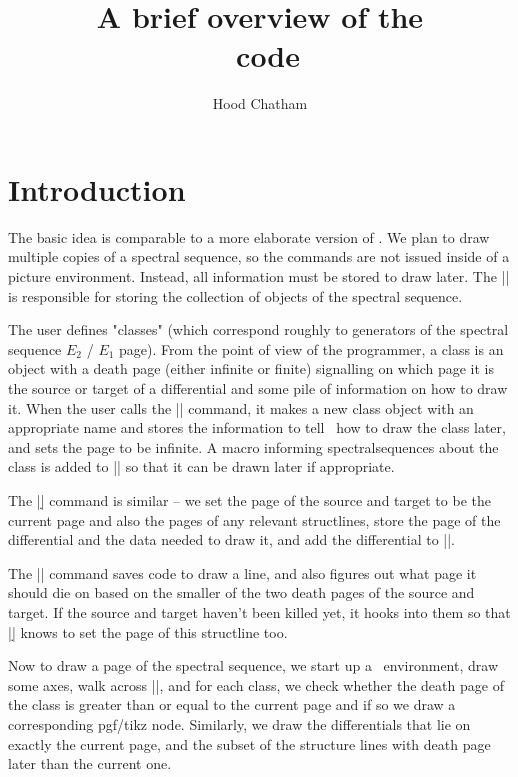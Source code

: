 

\def\eatclnifpresent#1{#1}
\def\pgfkeysname{pgfkeys}
\def\file#1{\path{#1.code.tex}}

\title{A brief overview of the \\ \sseqpages\ code}
\author{Hood Chatham\\\mailtoHC}
\maketitle
\section{Introduction}
The basic idea is comparable to a more elaborate version of \tikzcdpkg.
We plan to draw multiple copies of a spectral sequence, so the commands are not issued inside of a picture environment.
Instead, all information must be stored to draw later. The |\sseq@savedpaths| is responsible for storing the collection of objects of the spectral sequence.

The user defines "classes" (which correspond roughly to generators of the spectral sequence $E_2$ / $E_1$ page).
From the point of view of the programmer, a class is an object with a death page (either infinite or finite) signalling on which page it is the source or target of a differential
and some pile of information on how to draw it. When the user calls the |\class| command, it makes a new class object with an appropriate name and stores the
information to tell \spectralsequences\ how to draw the class later, and sets the page to be infinite. A macro informing spectralsequences about the class
is added to |\sseq@savedpaths| so that it can be drawn later if appropriate.

The |\d| command is similar -- we set the page of the source and target to be the current page and also the pages of any relevant structlines, store the page of the differential and the data needed to draw it, and add the differential to |\sseq@savedpaths|.

The |\structline| command saves code to draw a line, and also figures out what page it should die on based on the smaller of the two death pages of the source and target. If the source and target haven't been killed yet, it hooks into them so that |\d| knows to set the page of this structline too.

Now to draw a page of the spectral sequence, we start up a \tikzpictureenv\ environment, draw some axes,
walk across |\sseq@savedpaths|, and for each class, we check whether the death page of the class is greater than or equal to the current page and if so we draw a corresponding
pgf/tikz node. Similarly, we draw the differentials that lie on exactly the current page, and the subset of the structure lines with death page later than the current one.

